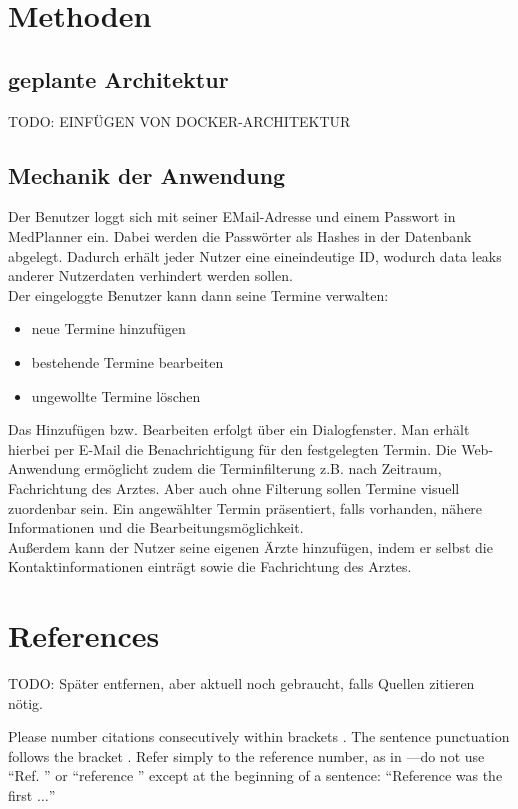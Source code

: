 \documentclass[conference]{IEEEtran}
\begin{document}
\section{Methoden}
\subsection{geplante Architektur}
TODO: EINFÜGEN VON DOCKER-ARCHITEKTUR
\subsection{Mechanik der Anwendung}
Der Benutzer loggt sich mit seiner EMail-Adresse und einem Passwort in MedPlanner ein. Dabei werden die Passwörter als Hashes in der Datenbank abgelegt. Dadurch erhält jeder Nutzer eine eineindeutige ID, wodurch data leaks anderer Nutzerdaten verhindert werden sollen.\\
Der eingeloggte Benutzer kann dann seine Termine verwalten: 
\begin{itemize}
	\item neue Termine hinzufügen
	\item bestehende Termine bearbeiten
	\item ungewollte Termine löschen
\end{itemize}
Das Hinzufügen bzw. Bearbeiten erfolgt über ein Dialogfenster.
Man erhält hierbei per E-Mail die Benachrichtigung für den festgelegten Termin.
Die Web-Anwendung ermöglicht zudem die Terminfilterung z.B. nach Zeitraum, Fachrichtung des Arztes. Aber auch ohne Filterung sollen Termine visuell zuordenbar sein. Ein angewählter Termin präsentiert, falls vorhanden, nähere Informationen und die Bearbeitungsmöglichkeit.\\
Außerdem kann der Nutzer seine eigenen Ärzte hinzufügen, indem er selbst die Kontaktinformationen einträgt sowie die Fachrichtung des Arztes.

\section*{References}

TODO: Später entfernen, aber aktuell noch gebraucht, falls Quellen zitieren nötig.


Please number citations consecutively within brackets \cite{b1}. The 
sentence punctuation follows the bracket \cite{b2}. Refer simply to the reference 
number, as in \cite{b3}---do not use ``Ref. \cite{b3}'' or ``reference \cite{b3}'' except at 
the beginning of a sentence: ``Reference \cite{b3} was the first $\ldots$''
\end{document}
